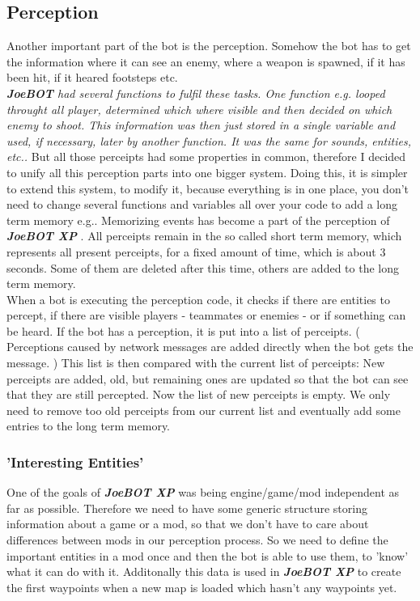 \documentclass[12pt]{article}
\newcommand {\joebotxp}{\textit{\textbf{JoeBOT XP}} }
\newcommand {\joebot}{\textit{\textbf{JoeBOT}} }
\begin{document}
\subsection{Perception}
Another important part of the bot is the perception. Somehow the bot has to get the information where it can see an enemy, where a weapon is spawned, if it has been hit, if it heared footsteps etc. \\ 
\textit{\joebot had several functions to fulfil these tasks. One function e.g. looped throught all player, determined which where visible and then decided on which enemy to shoot. This information was then just stored in a single variable and used, if necessary, later by another function. It was the same for sounds, entities, etc..} But all those perceipts had some properties in common, therefore I decided to unify all this perception parts into one bigger system. Doing this, it is simpler to extend this system, to modify it, because everything is in one place, you don't need to change several functions and variables all over your code to add a long term memory e.g.. Memorizing events has become a part of the perception of \joebotxp. All perceipts remain in the so called short term memory, which represents all present perceipts, for a fixed amount of time, which is about 3 seconds. Some of them are deleted after this time, others are added to the long term memory.\\
When a bot is executing the perception code, it checks if there are entities to percept, if there are visible players - teammates or enemies - or if something can be heard. If the bot has a perception, it is put into a list of perceipts. ( Perceptions caused by network messages are added directly when the bot gets the message. ) This list is then compared with the current list of perceipts: New perceipts are added, old, but remaining ones are updated so that the bot can see that they are still percepted. Now the list of new perceipts is empty. We only need to remove too old perceipts from our current list and eventually add some entries to the long term memory.

\subsubsection{'Interesting Entities'}

One of the goals of \joebotxp was being engine/game/mod independent as far as possible. Therefore we need to have some generic structure storing information about a game or a mod, so that we don't have to care about differences between mods in our perception process. So we need to define the important entities in a mod once and then the bot is able to use them, to 'know' what it can do with it. Additonally this data is used in \joebotxp to create the first waypoints when a new map is loaded which hasn't any waypoints yet.
\end{document}
